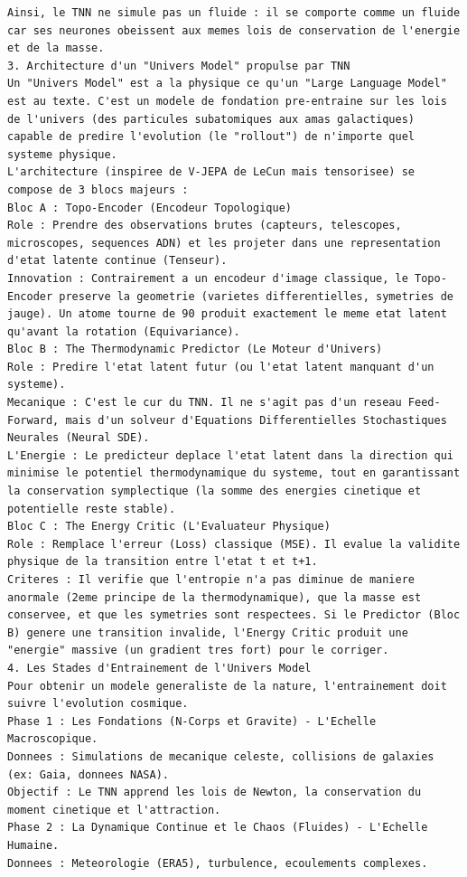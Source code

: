 \documentclass[11pt,a4paper]{article}
\begin{document}
\begin{lstlisting}[language={}, caption={}, basicstyle=\ttfamily\footnotesize, breaklines=true]
Ainsi, le TNN ne simule pas un fluide : il se comporte comme un fluide car ses neurones obeissent aux memes lois de conservation de l'energie et de la masse.
3. Architecture d'un "Univers Model" propulse par TNN
Un "Univers Model" est a la physique ce qu'un "Large Language Model" est au texte. C'est un modele de fondation pre-entraine sur les lois de l'univers (des particules subatomiques aux amas galactiques) capable de predire l'evolution (le "rollout") de n'importe quel systeme physique.
L'architecture (inspiree de V-JEPA de LeCun mais tensorisee) se compose de 3 blocs majeurs :
Bloc A : Topo-Encoder (Encodeur Topologique)
Role : Prendre des observations brutes (capteurs, telescopes, microscopes, sequences ADN) et les projeter dans une representation d'etat latente continue (Tenseur).
Innovation : Contrairement a un encodeur d'image classique, le Topo-Encoder preserve la geometrie (varietes differentielles, symetries de jauge). Un atome tourne de 90 produit exactement le meme etat latent qu'avant la rotation (Equivariance).
Bloc B : The Thermodynamic Predictor (Le Moteur d'Univers)
Role : Predire l'etat latent futur (ou l'etat latent manquant d'un systeme).
Mecanique : C'est le cur du TNN. Il ne s'agit pas d'un reseau Feed-Forward, mais d'un solveur d'Equations Differentielles Stochastiques Neurales (Neural SDE).
L'Energie : Le predicteur deplace l'etat latent dans la direction qui minimise le potentiel thermodynamique du systeme, tout en garantissant la conservation symplectique (la somme des energies cinetique et potentielle reste stable).
Bloc C : The Energy Critic (L'Evaluateur Physique)
Role : Remplace l'erreur (Loss) classique (MSE). Il evalue la validite physique de la transition entre l'etat t et t+1.
Criteres : Il verifie que l'entropie n'a pas diminue de maniere anormale (2eme principe de la thermodynamique), que la masse est conservee, et que les symetries sont respectees. Si le Predictor (Bloc B) genere une transition invalide, l'Energy Critic produit une "energie" massive (un gradient tres fort) pour le corriger.
4. Les Stades d'Entrainement de l'Univers Model
Pour obtenir un modele generaliste de la nature, l'entrainement doit suivre l'evolution cosmique.
Phase 1 : Les Fondations (N-Corps et Gravite) - L'Echelle Macroscopique.
Donnees : Simulations de mecanique celeste, collisions de galaxies (ex: Gaia, donnees NASA).
Objectif : Le TNN apprend les lois de Newton, la conservation du moment cinetique et l'attraction.
Phase 2 : La Dynamique Continue et le Chaos (Fluides) - L'Echelle Humaine.
Donnees : Meteorologie (ERA5), turbulence, ecoulements complexes.

\end{lstlisting}
\end{document}
